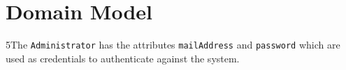 \documentclass[fontsize=12pt,
               paper=a4,
               twoside=false,
               parskip=half,
               ]{scrartcl}
\begin{document}
\newcommand{\doctitle}{Domain Model}
\newcommand{\docrevision}{68}


\tableofcontents

\section{Domain Model}





5The \texttt{Administrator} has the attributes \texttt{mailAddress} and \texttt{password} which are used as credentials to authenticate against the system. 




\end{document}
